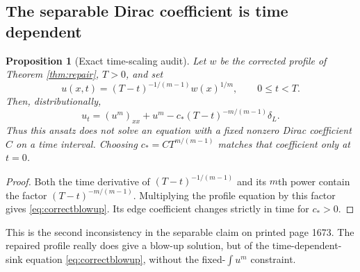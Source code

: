 \documentclass[11pt,a4paper]{article}
\newtheorem{proposition}[theorem]{Proposition}
\theoremstyle{remark}\newtheorem{remark}[theorem]{Remark}
\begin{document}
\subsection{The separable Dirac coefficient is time dependent}
\begin{proposition}[Exact time-scaling audit]
Let $w$ be the corrected profile of Theorem \ref{thm:repair}, $T>0$, and set
\[
 u(x,t)=(T-t)^{-1/(m-1)}w(x)^{1/m},\qquad 0\leq t<T.
\]
Then, distributionally,
\begin{equation}
 u_t=(u^m)_{xx}+u^m
 -c_*(T-t)^{-m/(m-1)}\delta_L.\label{eq:correctblowup}
\end{equation}
Thus this ansatz does not solve an equation with a fixed nonzero Dirac coefficient $C$ on a time interval. Choosing $c_*=CT^{m/(m-1)}$ matches that coefficient only at $t=0$.
\end{proposition}
\begin{proof}
Both the time derivative of $(T-t)^{-1/(m-1)}$ and its $m$th power contain the factor $(T-t)^{-m/(m-1)}$. Multiplying the profile equation by this factor gives \eqref{eq:correctblowup}. Its edge coefficient changes strictly in time for $c_*>0$.
\end{proof}
This is the second inconsistency in the separable claim on printed page 1673. The repaired profile really does give a blow-up solution, but of the time-dependent-sink equation \eqref{eq:correctblowup}, without the fixed-$\int u^m$ constraint.
\end{document}
